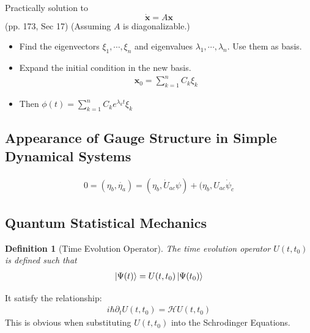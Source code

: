 \documentclass{article}
\numberwithin{equation}{subsection} %
\newtheorem{defi}{Definition}[section]
\theoremstyle{definition}
\begin{document}
    Practically solution to
    $$ \dot{\mathbf{x}} = A\mathbf{x}$$
    (pp. 173, Sec 17)
    (Assuming $A$ is diagonalizable.)
    \begin{itemize}
        \item Find the eigenvectors $\xi_1,\cdots ,\xi_n$ and eigenvalues
            $\lambda_1,\cdots ,\lambda_n$. Use them as basis.
        \item Expand the initial condition in the new basis.
            \begin{align}
                \mathbf{x}_0=\sum_{k=1}^{n} C_k\xi_k
            \end{align}
        \item Then $\phi(t) = \sum_{k=1}^n C_k e^{\lambda_k t}\xi_k$
    \end{itemize}
    \subsection{Appearance of Gauge Structure in Simple Dynamical Systems}
    
    \begin{align}
        0=(\eta_b,\dot{\eta_a}) = (\eta_b,\dot{U}_{ac}\psi) +
            (\eta_b,U_{ac}\dot{\psi}_c
    \end{align}
    \subsection{Quantum Statistical Mechanics}
    \label{sec:Quantum Statistical Mechanics}
    \begin{defi}[Time Evolution Operator]
        The time evolution operator $U(t,t_0)$ is defined such that
        \begin{align}
            \label{eq:def_time_evo_op}
            \ket{\Psi(t)} = U(t,t_0) \ket{\Psi(t_0)}
        \end{align}
    \end{defi}
    It satisfy the relationship:
    \begin{align}
        \label{eq:def_time_evo_op 2}
        i\hbar \partial_t U(t,t_0)= \mathcal{H} U(t,t_0)
    \end{align}
    This is obvious when substituting $U(t,t_0)$ into the Schrodinger 
    Equations.
    
\end{document}
